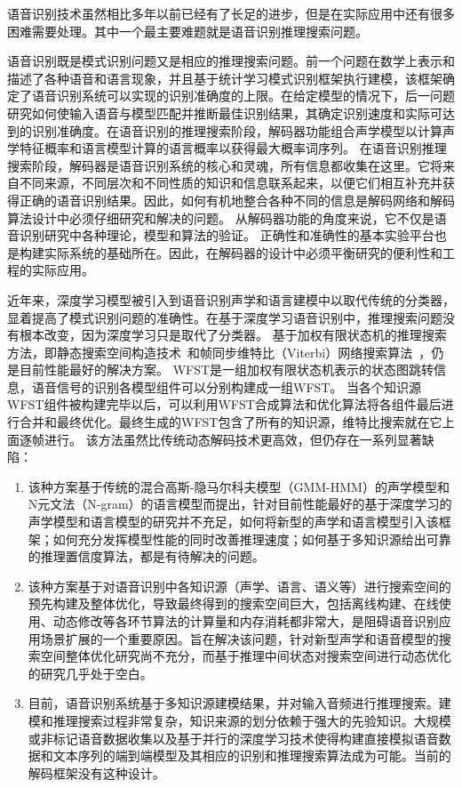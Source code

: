 语音识别技术虽然相比多年以前已经有了长足的进步，但是在实际应用中还有很多困难需要处理。其中一个最主要难题就是语音识别推理搜索问题。

语音识别既是模式识别问题又是相应的推理搜索问题。前一个问题在数学上表示和描述了各种语音和语言现象，并且基于统计学习模式识别框架执行建模，该框架确定了语音识别系统可以实现的识别准确度的上限。在给定模型的情况下，后一问题研究如何使输入语音与模型匹配并推断最佳识别结果，其确定识别速度和实际可达到的识别准确度。在语音识别的推理搜索阶段，解码器功能组合声学模型以计算声学特征概率和语言模型计算的语言概率以获得最大概率词序列。
在语音识别推理搜索阶段，解码器是语音识别系统的核心和灵魂，所有信息都收集在这里。它将来自不同来源，不同层次和不同性质的知识和信息联系起来，以便它们相互补充并获得正确的语音识别结果。因此，如何有机地整合各种不同的信息是解码网络和解码算法设计中必须仔细研究和解决的问题。
从解码器功能的角度来说，它不仅是语音识别研究中各种理论，模型和算法的验证。
正确性和准确性的基本实验平台也是构建实际系统的基础所在。因此，在解码器的设计中必须平衡研究的便利性和工程的实际应用。


近年来，深度学习模型被引入到语音识别声学和语言建模中以取代传统的分类器，显着提高了模式识别问题的准确性。在基于深度学习语音识别中，推理搜索问题没有根本改变，因为深度学习只是取代了分类器。
基于加权有限状态机的推理搜索方法，即静态搜索空间构造技术~\cite{mohri2002weighted}和帧同步维特比（Viterbi）网络搜索算法~\cite{forney1973viterbi}，仍是目前性能最好的解决方案。
WFST是一组加权有限状态机表示的状态图跳转信息，语音信号的识别各模型组件可以分别构建成一组WFST。
当各个知识源WFST组件被构建完毕以后，可以利用WFST合成算法和优化算法将各组件最后进行合并和最终优化。最终生成的WFST包含了所有的知识源，维特比搜索就在它上面逐帧进行。
该方法虽然比传统动态解码技术更高效，但仍存在一系列显著缺陷：
\begin{enumerate}
\item 
该种方案基于传统的混合高斯-隐马尔科夫模型（GMM-HMM）的声学模型和N元文法（N-gram）的语言模型而提出，针对目前性能最好的基于深度学习的声学模型和语言模型的研究并不充足，如何将新型的声学和语言模型引入该框架；如何充分发挥模型性能的同时改善推理速度；如何基于多知识源给出可靠的推理置信度算法，都是有待解决的问题。
\item 
该种方案基于对语音识别中各知识源（声学、语言、语义等）进行搜索空间的预先构建及整体优化，导致最终得到的搜索空间巨大，包括离线构建、在线使用、动态修改等各环节算法的计算量和内存消耗都非常大，是阻碍语音识别应用场景扩展的一个重要原因。旨在解决该问题，针对新型声学和语音模型的搜索空间整体优化研究尚不充分，而基于推理中间状态对搜索空间进行动态优化的研究几乎处于空白。
\item 目前，语音识别系统基于多知识源建模结果，并对输入音频进行推理搜索。建模和推理搜索过程非常复杂，知识来源的划分依赖于强大的先验知识。大规模或非标记语音数据收集以及基于并行的深度学习技术使得构建直接模拟语音数据和文本序列的端到端模型及其相应的识别和推理搜索算法成为可能。当前的解码框架没有这种设计。
\end{enumerate}

